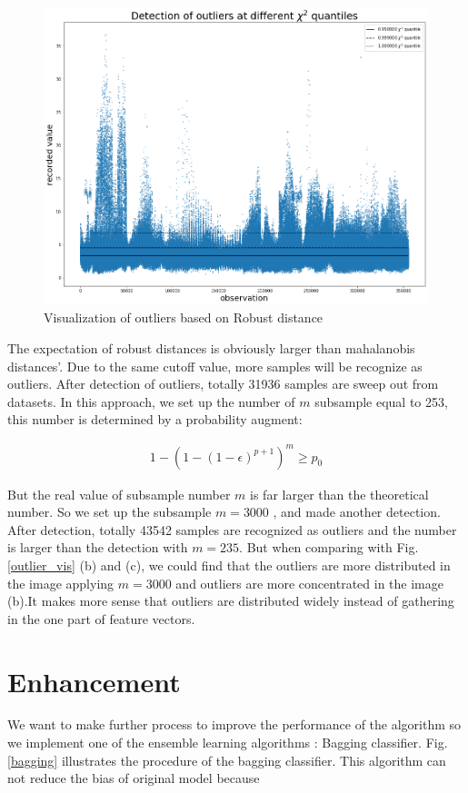 \documentclass[12pt,DIV14,BCOR12mm,a4paper,footinclude=false,headinclude,parskip=half-,twoside,openright,cleardoublepage=empty,toc=index,bibliography=totoc,listof=totoc]{scrreprt}
\numberwithin{equation}{chapter}
\begin{document}
   \begin{figure}
  	\centering
  	\includegraphics[scale=0.45]{image/robust_outlier}
  	\caption{Visualization of outliers based on Robust distance}
  	\label{robust_vis}
  \end{figure}

  The expectation of robust distances is obviously larger than mahalanobis distances'. Due to the same cutoff value, more samples will be recognize as outliers. After detection of outliers, totally 31936 samples are sweep out from datasets. In this approach, we set up the number of $m$ subsample equal to 253, this number is determined by a probability augment:
  
   \begin{align}
 1-(1-(1-\epsilon)^{p+1})^{m} \geq p_{0}
  \end{align}
  
  But the real value of subsample number $m$ is far larger than the theoretical number. So we set up the subsample $m=3000$ , and made another detection. After detection, totally 43542 samples are recognized as outliers and the number is larger than the detection with $m=235$. But when comparing with Fig.\ref{outlier_vis} (b) and (c), we could find that the outliers are more distributed in the image applying $m=3000$ and outliers are more concentrated in the image (b).It makes more sense that outliers are distributed widely instead of gathering in the one part of feature vectors.
  
 \section{Enhancement}
 We want to make further process to improve the performance of the algorithm so we implement one of the ensemble learning algorithms : Bagging classifier. Fig.\ref{bagging} illustrates the procedure of the bagging classifier. This algorithm can not reduce the bias of original model because 
 
\end{document}

